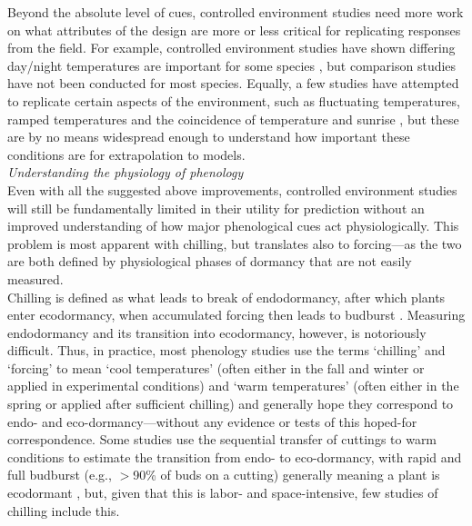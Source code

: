 \documentclass[11pt,letter]{article}
\begin{document}
Beyond the absolute level of cues, controlled environment studies need more work on what attributes of the design are more or less critical for replicating responses from the field. For example, controlled environment studies have shown differing day/night temperatures are important for some species \citep{heuvelink1989influence,abrol1996effects,Thingnaes2003,pressman2006exposing}, but comparison studies have not been conducted for most species. Equally, a few studies have attempted to replicate certain aspects of the environment, such as fluctuating temperatures, ramped temperatures and the coincidence of temperature and sunrise \citep{erwin1998}, but these are by no means widespread enough to understand how important these conditions are for extrapolation to models. \\

\emph{Understanding the physiology of phenology}\\
Even with all the suggested above improvements, controlled environment studies will still be fundamentally limited in their utility for prediction without an improved understanding of how major phenological cues act physiologically. This problem is most apparent with chilling, but translates also to forcing---as the two are both defined by physiological phases of dormancy that are not easily measured. \\

Chilling is defined as what leads to break of endodormancy, after which plants enter ecodormancy, when accumulated forcing then leads to budburst \citep{chuine2016}. Measuring endodormancy and its transition into ecodormancy, however, is notoriously difficult. Thus, in practice, most phenology studies use the terms `chilling' and `forcing' to mean `cool temperatures' (often either in the fall and winter or applied in experimental conditions) and `warm temperatures' (often either in the spring or applied after sufficient chilling) and generally hope they correspond to endo- and eco-dormancy---without any evidence or tests of this hoped-for correspondence. Some studies use the sequential transfer of cuttings to warm conditions to estimate the transition from endo- to eco-dormancy, with rapid and full budburst (e.g., $>$90\% of buds on a cutting) generally meaning a plant is ecodormant \citep[e.g.,][]{Junttila:2012aa}, but, given that this is labor- and space-intensive, few studies of chilling include this. \\
\end{document}
